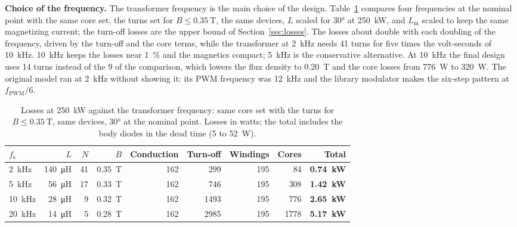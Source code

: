 \documentclass[12pt,a4paper]{scrartcl}
\newcommand{\ped}[1]{_{\mathrm{#1}}}
\begin{document}
\begin{onehalfspace}
\noindent\textbf{Choice of the frequency.} The transformer frequency is the main choice of the design. Table~\ref{tab:freq} compares four frequencies at the nominal point with the same core set, the turns set for $B \le \SI{0.35}{\tesla}$, the same devices, $L$ scaled for \ang{30} at \SI{250}{\kilo\watt}, and $L\ped{m}$ scaled to keep the same magnetizing current; the turn-off losses are the upper bound of Section~\ref{sec:losses}. The losses about double with each doubling of the frequency, driven by the turn-off and the core terms, while the transformer at \SI{2}{\kilo\hertz} needs 41 turns for five times the volt-seconds of \SI{10}{\kilo\hertz}. \SI{10}{\kilo\hertz} keeps the losses near \SI{1}{\percent} and the magnetics compact; \SI{5}{\kilo\hertz} is the conservative alternative. At \SI{10}{\kilo\hertz} the final design uses 14 turns instead of the 9 of the comparison, which lowers the flux density to \SI{0.20}{\tesla} and the core losses from \SI{776}{\watt} to \SI{320}{\watt}. The original model ran at \SI{2}{\kilo\hertz} without showing it: its PWM frequency was \SI{12}{\kilo\hertz} and the library modulator makes the six-step pattern at $f\ped{PWM}/6$.

\begin{table}[H]
	\centering
	\captionsetup{width=0.9\textwidth, font=small}
	\caption[Losses against the transformer frequency.]{Losses at \SI{250}{\kilo\watt} against the transformer frequency: same core set with the turns for $B \le \SI{0.35}{\tesla}$, same devices, \ang{30} at the nominal point. Losses in watts; the total includes the body diodes in the dead time (5 to \SI{52}{\watt}).}
	\label{tab:freq}
	\small
	\begin{tabularx}{0.97\textwidth}{@{} X r r r r r r r r @{}}
		\toprule
		$f\ped{s}$ & $L$ & $N$ & $B$ & Conduction & Turn-off & Windings & Cores & \textbf{Total} \\
		\midrule
		\SI{2}{\kilo\hertz} & \SI{140}{\micro\henry} & 41 & \SI{0.35}{\tesla} & 162 & 299 & 195 & 84 & \textbf{\SI{0.74}{\kilo\watt}} \\
		\SI{5}{\kilo\hertz} & \SI{56}{\micro\henry} & 17 & \SI{0.33}{\tesla} & 162 & 746 & 195 & 308 & \textbf{\SI{1.42}{\kilo\watt}} \\
		\SI{10}{\kilo\hertz} & \SI{28}{\micro\henry} & 9 & \SI{0.32}{\tesla} & 162 & 1493 & 195 & 776 & \textbf{\SI{2.65}{\kilo\watt}} \\
		\SI{20}{\kilo\hertz} & \SI{14}{\micro\henry} & 5 & \SI{0.28}{\tesla} & 162 & 2985 & 195 & 1778 & \textbf{\SI{5.17}{\kilo\watt}} \\
		\bottomrule
	\end{tabularx}
\end{table}


\end{onehalfspace}
\end{document}
